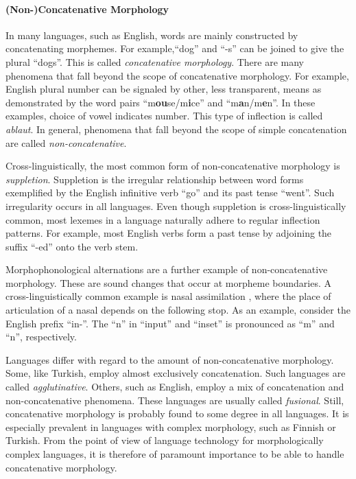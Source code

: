\paragraph{(Non-)Concatenative Morphology} In many languages, such as
English, words are mainly constructed by concatenating morphemes. For
example,``dog'' and ``-s'' can be joined to give the plural
``dogs''. This is called {\it concatenative morphology}. There are
many phenomena that fall beyond the scope of concatenative
morphology. For example, English plural number can be signaled by
other, less transparent, means as demonstrated by the word pairs
``m{\bf ou}se/m{\bf i}ce'' and ``m{\bf a}n/m{\bf e}n''. In these
examples, choice of vowel indicates number. This type of inflection is
called {\it ablaut}. In general, phenomena that fall beyond the scope
of simple concatenation are called {\it non-concatenative}.

Cross-linguistically, the most common form of non-concatenative
morphology is {\it suppletion}. Suppletion is the irregular
relationship between word forms exemplified by the English infinitive
verb ``go'' and its past tense ``went''. Such irregularity occurs in
all languages. Even though suppletion is cross-linguistically common,
most lexemes in a language naturally adhere to regular inflection
patterns. For example, most English verbs form a past tense by
adjoining the suffix ``-ed'' onto the verb stem.

Morphophonological alternations are a further example of
non-concatenative morphology. These are sound changes that occur at
morpheme boundaries. A cross-linguistically common example is nasal
assimilation \citep[p. 29]{Carr1993}, where the place of articulation
of a nasal depends on the following stop. As an example, consider the
English prefix ``in-''. The ``n'' in ``input'' and ``inset'' is
pronounced as ``m'' and ``n'', respectively.

Languages differ with regard to the amount of non-concatenative
morphology. Some, like Turkish, employ almost exclusively
concatenation.  Such languages are called {\it agglutinative}. Others,
such as English, employ a mix of concatenation and non-concatenative
phenomena. These languages are usually called {\it fusional}. Still,
concatenative morphology is probably found to some degree in all
languages. It is especially prevalent in languages with complex
morphology, such as Finnish or Turkish. From the point of view of
language technology for morphologically complex languages, it is
therefore of paramount importance to be able to handle concatenative
morphology.

